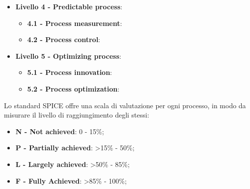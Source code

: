 \begin{itemize}
	\item \textbf {Livello 4 - Predictable process}:
		\begin{itemize}
		\item \textbf{4.1 - Process measurement}:
		\item \textbf{4.2 - Process control}:
		\end{itemize}
	\item \textbf {Livello 5 - Optimizing process}:
		\begin{itemize}
		\item \textbf{5.1 - Process innovation}:
		\item \textbf{5.2 - Process optimization}:
		\end{itemize}
	\end{itemize}
	
	Lo standard SPICE offre una scala di valutazione per ogni processo, in modo da misurare il livello di raggiungimento degli stessi:
	\begin{itemize}
	\item \textbf{N - Not achieved}: 0 - 15\%;
	\item \textbf{P - Partially achieved}: >15\% - 50\%;
	\item \textbf{L - Largely achieved}: >50\% - 85\%;
	\item \textbf{F - Fully Achieved}: >85\% - 100\%;
	\end{itemize}


\pagebreak